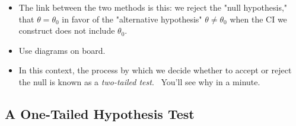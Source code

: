 \documentclass[11pt]{article}
\begin{document}
\begin{itemize}
\begin{itemize}
\item The link between the two methods is this: we reject the "null
hypothesis," that $\theta =\theta _{0}$ in favor of the "alternative
hypothesis" $\theta \neq \theta _{0}$ when the CI we construct does not
include $\theta _{0}.$

\item Use diagrams on board.

\item In this context, the process by which we decide whether to accept or
reject the null is known as a \textit{two-tailed test}. \ You'll see why in
a minute.
\end{itemize}
\end{itemize}

\subsection{A One-Tailed Hypothesis Test}
\end{document}
